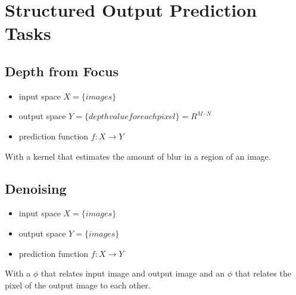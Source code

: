 
\section*{Structured Output Prediction Tasks}

\subsection*{Depth from Focus}
\begin{itemize}
    \item input space $X = \{images \}$
    \item output space $Y = \{depth value for each pixel\} = R^{M\cdot N}$
    \item prediction function $f : X \rightarrow Y$
\end{itemize}

With a kernel that estimates the amount of blur in a region of an image.


\subsection*{Denoising} 

\begin{itemize}
    \item input space $X = \{images \}$
    \item output space $Y = \{images \}$
    \item prediction function $f : X \rightarrow Y$
\end{itemize}

With a $\phi$ that relates input image and output image and an $\phi$ that relates the pixel of the output image to each other.
